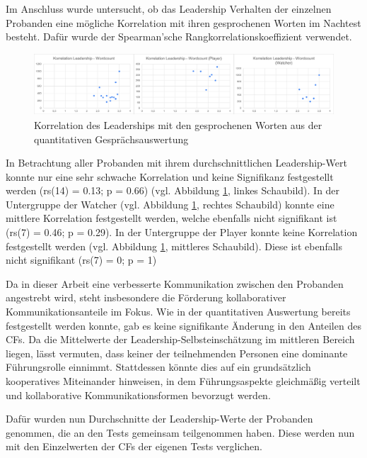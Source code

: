 Im Anschluss wurde untersucht, ob das Leadership Verhalten der einzelnen Probanden eine mögliche Korrelation mit ihren gesprochenen Worten im Nachtest besteht. Dafür wurde der Spearman'sche Rangkorrelationskoeffizient verwendet.

\begin{figure}[ht]
\centering
\includegraphics[width=1\linewidth]{content/pictures/Korrelation_Leadership_Wordcount_full.png}
\caption{Korrelation des Leaderships mit den gesprochenen Worten aus der quantitativen Gesprächsauswertung}
\label{fig:correlation_leadership_wordcount}
\end{figure}

In Betrachtung aller Probanden mit ihrem durchschnittlichen Leadership-Wert konnte nur eine sehr schwache Korrelation und keine Signifikanz festgestellt werden (rs(14) = 0.13; p = 0.66) (vgl. Abbildung \ref{fig:correlation_leadership_wordcount}, linkes Schaubild). In der Untergruppe der Watcher (vgl. Abbildung \ref{fig:correlation_leadership_wordcount}, rechtes Schaubild) konnte eine mittlere Korrelation festgestellt werden, welche ebenfalls nicht signifikant ist (rs(7) = 0.46; p = 0.29). In der Untergruppe der Player konnte keine Korrelation festgestellt werden (vgl. Abbildung \ref{fig:correlation_leadership_wordcount}, mittleres Schaubild). Diese ist ebenfalls nicht signifikant (rs(7) = 0; p = 1)

Da in dieser Arbeit eine verbesserte Kommunikation zwischen den Probanden angestrebt wird, steht insbesondere die Förderung kollaborativer Kommunikationsanteile im Fokus. Wie in der quantitativen Auswertung bereits festgestellt werden konnte, gab es keine signifikante Änderung in den Anteilen des \ac{CF}s. Da die Mittelwerte der Leadership-Selbsteinschätzung im mittleren Bereich liegen, lässt vermuten, dass keiner der teilnehmenden Personen eine dominante Führungsrolle einnimmt. Stattdessen könnte dies auf ein grundsätzlich kooperatives Miteinander hinweisen, in dem Führungsaspekte gleichmäßig verteilt und kollaborative Kommunikationsformen bevorzugt werden.

Dafür wurden nun Durchschnitte der Leadership-Werte der Probanden genommen, die an den Tests gemeinsam teilgenommen haben. Diese werden nun mit den Einzelwerten der \ac{CF}s der eigenen Tests verglichen.


